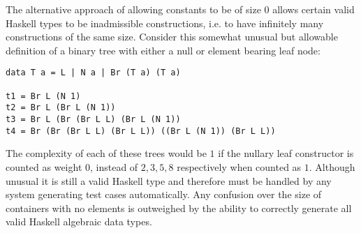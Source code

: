 The alternative approach of allowing constants to be of size 0
allows certain valid Haskell types to be inadmissible constructions,
i.e. to have infinitely many constructions of the same size.
Consider this somewhat unusual but allowable definition
of a binary tree with either a null or element bearing leaf node:

\begin{lstlisting}
data T a = L | N a | Br (T a) (T a)

t1 = Br L (N 1)
t2 = Br L (Br L (N 1))
t3 = Br L (Br (Br L L) (Br L (N 1))
t4 = Br (Br (Br L L) (Br L L)) ((Br L (N 1)) (Br L L))
\end{lstlisting}

The complexity of each of these trees would be $1$ if
the nullary leaf constructor is counted as weight $0$,
instead of $ 2, 3, 5, 8$ respectively when counted as $1$.
Although unusual it is still a valid Haskell type and therefore must be handled by
any \pbt system generating test cases automatically.
Any confusion over the size of containers with no elements
is outweighed by the ability to correctly generate all valid Haskell algebraic data types.